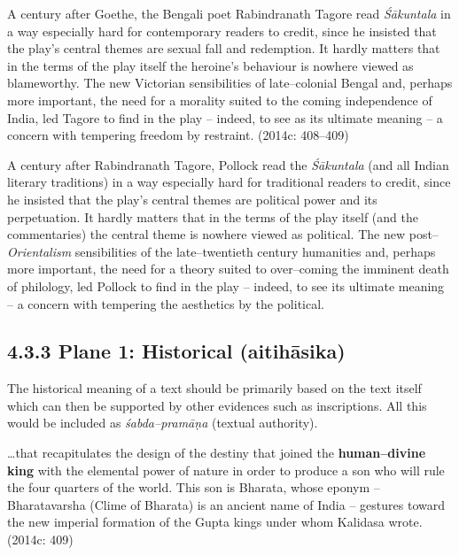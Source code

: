 \begin{myquote}
A century after Goethe, the Bengali poet Rabindranath Tagore read \textit{Śākuntala} in a way especially hard for contemporary readers to credit, since he insisted that the play’s central themes are sexual fall and redemption. It hardly matters that in the terms of the play itself the heroine’s behaviour is nowhere viewed as blameworthy. The new Victorian sensibilities of late–colonial Bengal and, perhaps more important, the need for a morality suited to the coming independence of India, led Tagore to find in the play – indeed, to see as its ultimate meaning – a concern with tempering freedom by restraint. (2014c: 408–409)
\end{myquote}

A century after Rabindranath Tagore, Pollock read the \textit{Śākuntala} (and all Indian literary traditions) in a way especially hard for traditional readers to credit, since he insisted that the play’s central themes are political power and its perpetuation. It hardly matters that in the terms of the play itself (and the commentaries) the central theme is nowhere viewed as political. The new post–\textit{Orientalism} sensibilities of the late–twentieth century humanities and, perhaps more important, the need for a theory suited to over–coming the imminent death of philology, led Pollock to find in the play – indeed, to see its ultimate meaning – a concern with tempering the aesthetics by the political.

\vspace{-.3cm}

\subsection*{4.3.3 Plane 1: Historical (aitihāsika)}

The historical meaning of a text should be primarily based on the text itself which can then be supported by other evidences such as inscriptions. All this would be included as \textit{śabda–pramāṇa} (textual authority).

\begin{myquote}
…that recapitulates the design of the destiny that joined the \textbf{human–divine king} with the elemental power of nature in order to produce a son who will rule the four quarters of the world. This son is Bharata, whose eponym – Bharatavarsha (Clime of Bharata) is an ancient name of India – gestures toward the new imperial formation of the Gupta kings under whom Kalidasa wrote. (2014c: 409)
\end{myquote}

